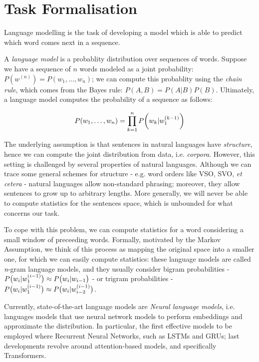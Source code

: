 \section{Task Formalisation}
Language modelling is the task of developing a model which is able to predict which word comes next in a sequence. 

A \emph{language model} is a probablity distribution over sequences of words. Suppose we have a sequence of \(n\) words modeled as a joint probability: \(P(w^{(n)}) = P(w_1, \ldots, w_n)\); we can compute this probablity using the \emph{chain rule}, which comes from the Bayes rule: \(P(A, B) = P(A|B)P(B)\). Ultimately, a language model computes the probability of a sequence as follows:

\begin{equation}
    P(w_1, \ldots, w_n)  = \prod_{k=1}^{n}P \parenth[\bigg]{w_k|w_1^{(k-1)}}
\end{equation}

The underlying assumption is that sentences in natural languages have \emph{structure}, hence we can compute the joint distribution from data, i.e. \emph{corpora}. However, this setting is challenged by several properties of natural languages. Although we can trace some general schemes for structure - e.g. word orders like VSO, SVO, \emph{et cetera} - natural languages allow non-standard phrasing; moreover, they allow sentences to grow up to arbitrary lengths. More generally, we will never be able to compute statistics for the sentences space, which is unbounded for what concerns our task.

To cope with this problem, we can compute statistics for a word considering a small window of preceeding words. Formally, motivated by the Markov Assumption, we think of this process as mapping the original space into a smaller one, for which we can easily compute statistics: these language models are called \emph{n}-gram language models, and they usually consider bigram probabilities - \(P \parenth[\big]{w_i | w_1^{(i-1)}} \approx P \parenth[\big]{w_i | w_{i-1}}\) - or trigram probabilities - \(P\parenth[\big]{w_i | w_1^{(i-1)}} \approx P \parenth[\big]{w_i | w_{i-2}^{(i-1)}}\).

Currently, state-of-the-art language models are \emph{Neural language models}, i.e. languages models that use neural network models to perform embeddings and approximate the distribution. In particular, the first effective models to be employed where Recurrent Neural Networks, such as LSTMs and GRUs; last developments revolve around attention-based models, and specifically Transformers. 
